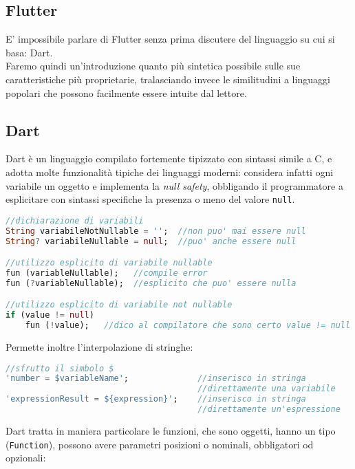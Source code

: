 \begin{appendices}
    
\chapter{Flutter}
\label{ch:flutter}
E' impossibile parlare di Flutter senza prima discutere del linguaggio su cui si basa: Dart.\\
Faremo quindi un'introduzione quanto più sintetica possibile sulle sue caratteristiche più proprietarie, tralasciando invece le similitudini a linguaggi popolari che possono facilmente essere intuite dal lettore.
\section{Dart}
Dart è un linguaggio compilato fortemente tipizzato con sintassi simile a C, e adotta molte funzionalità tipiche dei linguaggi moderni: considera infatti ogni variabile un oggetto e implementa la \textit{null safety}, obbligando il programmatore a esplicitare con sintassi specifiche la presenza o meno del valore \verb+null+.

\begin{lstlisting}[language=dart, firstnumber=1,caption={Dart \textit{null safety}}]
//dichiarazione di variabili
String variabileNotNullable = '';  //non puo' mai essere null
String? variabileNullable = null;  //puo' anche essere null

//utilizzo esplicito di variabile nullable
fun (variableNullable);   //compile error
fun (?variableNullable);  //esplicito che puo' essere nulla

//utilizzo esplicito di variabile not nullable
if (value != null)
    fun (!value);   //dico al compilatore che sono certo value != null
\end{lstlisting} 

Permette inoltre l'interpolazione di stringhe:

\begin{lstlisting}[language=dart, firstnumber=1,caption={Dart interpolazone stringhe}]
//sfrutto il simbolo $
'number = $variableName';              //inserisco in stringa 
                                       //direttamente una variabile
'expressionResult = ${expression}';    //inserisco in stringa
                                       //direttamente un'espressione
\end{lstlisting}

Dart tratta in maniera particolare le funzioni, che sono oggetti, hanno un tipo (\verb+Function+), possono avere parametri posizioni o nominali, obbligatori od opzionali: 


\end{appendices}
